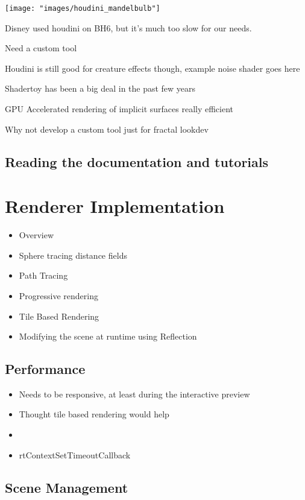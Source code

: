 \documentclass[11pt,a4paper,final,notitlepage]{report}
\begin{document}
\begin{center}
\texttt{[image: "images/houdini\_mandelbulb"]}
\end{center}

Disney used houdini on BH6, but it's much too slow for our needs.

Need a custom tool

Houdini is still good for creature effects though, example noise shader goes here

Shadertoy has been a big deal in the past few years

GPU Accelerated rendering of implicit surfaces really efficient

Why not develop a custom tool just for fractal lookdev

\section{Reading the documentation and tutorials}

\chapter{Renderer Implementation}

\begin{itemize}
	\item Overview
	\item Sphere tracing distance fields
	\item Path Tracing
	\item Progressive rendering
	\item Tile Based Rendering
	\item Modifying the scene at runtime using Reflection
\end{itemize}

\section{Performance}

\begin{itemize}
	\item Needs to be responsive, at least during the interactive preview
	\item Thought tile based rendering would help
	\item 
	\item rtContextSetTimeoutCallback
\end{itemize}


\section{Scene Management}
\end{document}
